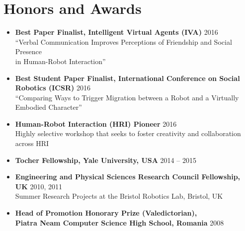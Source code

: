 \documentclass[10pt,letterpaper]{article}
\newcommand{\thing}[2]{{#1} \hfill {#2}}
\begin{document}
\section{Honors and Awards}
\vspace{-0.5em}
\begin{itemize}%
\item \thing{\bf Best Paper Finalist, Intelligent Virtual Agents (IVA)}{2016}\\
	``Verbal Communication Improves Perceptions of Friendship and Social Presence \\
	 in Human-Robot Interaction''
\item \thing{\bf Best Student Paper Finalist, International Conference on Social Robotics (ICSR)}{2016}\\
	``Comparing Ways to Trigger Migration between a Robot
	 and a Virtually Embodied Character''
\item \thing{\bf Human-Robot Interaction (HRI) Pioneer}{2016}\\
	 Highly selective workshop that seeks to foster creativity and collaboration across HRI
\item \thing{\bf Tocher Fellowship, Yale University, USA}{2014 -- 2015}
\item \thing{\bf Engineering and Physical Sciences Research Council Fellowship, UK}{2010, 2011}\\
	Summer Research Projects at the Bristol Robotics Lab, Bristol, UK
\item \thing{\bf Head of Promotion Honorary Prize (Valedictorian),\\Piatra Neam\cb{t} Computer Science High School, Romania}{2008}
\end{itemize}
\end{document}
